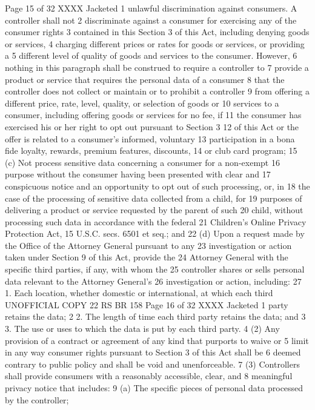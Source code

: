 Page 15 of 32
XXXX Jacketed
1 unlawful discrimination against consumers. A controller shall not
2 discriminate against a consumer for exercising any of the consumer rights
3 contained in this Section 3 of this Act, including denying goods or services,
4 charging different prices or rates for goods or services, or providing a
5 different level of quality of goods and services to the consumer. However,
6 nothing in this paragraph shall be construed to require a controller to
7 provide a product or service that requires the personal data of a consumer
8 that the controller does not collect or maintain or to prohibit a controller
9 from offering a different price, rate, level, quality, or selection of goods or
10 services to a consumer, including offering goods or services for no fee, if
11 the consumer has exercised his or her right to opt out pursuant to Section 3
12 of this Act or the offer is related to a consumer's informed, voluntary
13 participation in a bona fide loyalty, rewards, premium features, discounts,
14 or club card program;
15 (c) Not process sensitive data concerning a consumer for a non-exempt
16 purpose without the consumer having been presented with clear and
17 conspicuous notice and an opportunity to opt out of such processing, or, in
18 the case of the processing of sensitive data collected from a child, for
19 purposes of delivering a product or service requested by the parent of such
20 child, without processing such data in accordance with the federal
21 Children's Online Privacy Protection Act, 15 U.S.C. secs. 6501 et seq.; and
22 (d) Upon a request made by the Office of the Attorney General pursuant to any
23 investigation or action taken under Section 9 of this Act, provide the
24 Attorney General with the specific third parties, if any, with whom the
25 controller shares or sells personal data relevant to the Attorney General's
26 investigation or action, including:
27 1. Each location, whether domestic or international, at which each third 
UNOFFICIAL COPY 22 RS BR 158
Page 16 of 32
XXXX Jacketed
1 party retains the data;
2 2. The length of time each third party retains the data; and
3 3. The use or uses to which the data is put by each third party.
4 (2) Any provision of a contract or agreement of any kind that purports to waive or
5 limit in any way consumer rights pursuant to Section 3 of this Act shall be
6 deemed contrary to public policy and shall be void and unenforceable.
7 (3) Controllers shall provide consumers with a reasonably accessible, clear, and
8 meaningful privacy notice that includes:
9 (a) The specific pieces of personal data processed by the controller;

